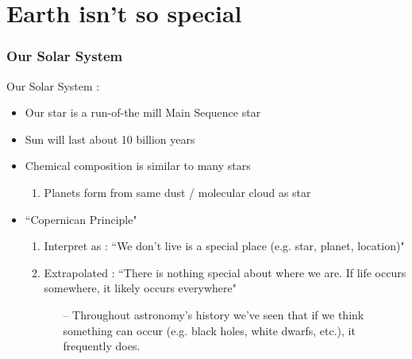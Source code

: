 \documentclass{beamer}
\begin{document}
\section{Earth isn't so special}
\begin{frame}
\frametitle{Our Solar System}
Our Solar System : 
\begin{itemize}
    \item Our star is a run-of-the mill Main Sequence star
    \pause
    \item Sun will last about 10 billion years
    \pause
    \item Chemical composition is similar to many stars 
    \pause
    \begin{enumerate}
        \item Planets form from same dust / molecular cloud as star
        \pause
    \end{enumerate}
    \item ``Copernican Principle"
    \pause
    \begin{enumerate}
        \item Interpret as : ``We don't live is a special place (e.g. star, planet, location)" 
        \pause
        \item Extrapolated : ``There is nothing special about where we are. If life occurs somewhere, it likely occurs everywhere"
        \pause
        \begin{itemize}
            \item[--] Throughout astronomy's history we've seen that if we think something can occur (e.g. black holes, white dwarfs, etc.), it frequently does.
        \end{itemize}
    \end{enumerate}
\end{itemize}
\end{frame}

\end{document}
